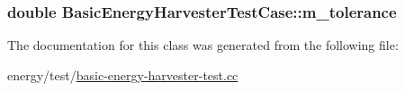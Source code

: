 \subsubsection[{\texorpdfstring{m\+\_\+tolerance}{m_tolerance}}]{\setlength{\rightskip}{0pt plus 5cm}double Basic\+Energy\+Harvester\+Test\+Case\+::m\+\_\+tolerance}\hypertarget{classBasicEnergyHarvesterTestCase_ab99eb52f3d30d0a6bd4355bbea80a2a7}{}\label{classBasicEnergyHarvesterTestCase_ab99eb52f3d30d0a6bd4355bbea80a2a7}


The documentation for this class was generated from the following file\+:\begin{DoxyCompactItemize}
\item 
energy/test/\hyperlink{basic-energy-harvester-test_8cc}{basic-\/energy-\/harvester-\/test.\+cc}\end{DoxyCompactItemize}
